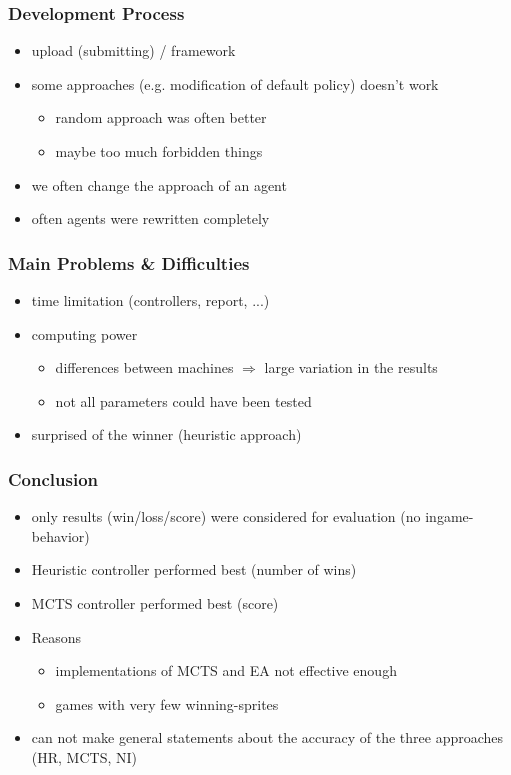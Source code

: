 \documentclass{beamer}
\begin{document}
\begin{frame}
\frametitle{Development Process}
\begin{itemize}
	\item upload (submitting) / framework
	\item some approaches (e.g. modification of default policy) doesn't work
	\begin{itemize}
		\item random approach was often better
		\item maybe too much forbidden things
	\end{itemize}
	\item we often change the approach of an agent
	\item often agents were rewritten completely
\end{itemize}
\end{frame}




\begin{frame}
\frametitle{Main Problems \& Difficulties}
\begin{itemize}
	\item time limitation (controllers, report, ...)
	\item computing power
	\begin{itemize}
		\item differences between machines $\Rightarrow$ large variation in the results
		\item not all parameters could have been tested
	\end{itemize}
	\item surprised of the winner (heuristic approach)
\end{itemize}
\end{frame}


\begin{frame}
\frametitle{Conclusion}
\begin{itemize}
		\item only results (win/loss/score) were considered for evaluation (no ingame-behavior)
		\item Heuristic controller performed best (number of wins)
		\item MCTS controller performed best (score)
		\item Reasons
		\begin{itemize}
			\item implementations of MCTS and EA not effective enough
			\item games with very few winning-sprites
		\end{itemize}
		\item can not make general statements about the accuracy of the three approaches  (HR, MCTS, NI)
\end{itemize}

\end{frame}
\end{document}
